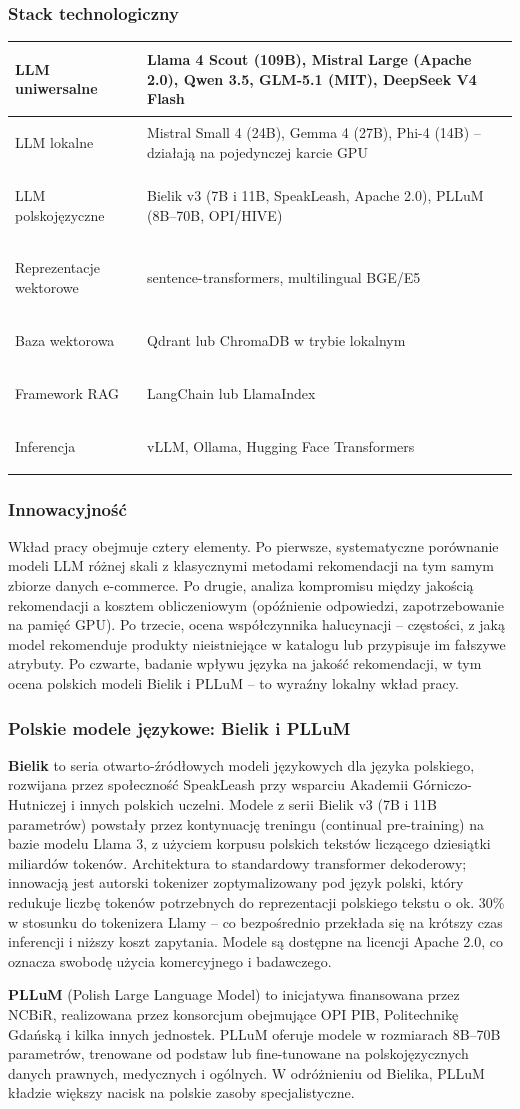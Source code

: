 \documentclass[12pt,a4paper]{article}
\newenvironment{stacktab}{%
    \arrayrulecolor{border}%
    \begin{tabular}{|>{\columncolor{lightbg}\bfseries\color{primary}\raggedright\arraybackslash}p{4.2cm}|>{\raggedright\arraybackslash}p{12cm}|}
    \hline
}{%
    \end{tabular}%
    \arrayrulecolor{black}%
}
\newcommand{\stackrow}[2]{#1 & #2 \\ \hline}
\newcommand{\topicsection}[1]{\subsubsection*{#1}}
\begin{document}
\topicsection{Stack technologiczny}
\begin{stacktab}
\stackrow{LLM uniwersalne}{Llama 4 Scout (109B), Mistral Large (Apache 2.0), Qwen 3.5, GLM-5.1 (MIT), DeepSeek V4 Flash}
\stackrow{LLM lokalne}{Mistral Small 4 (24B), Gemma 4 (27B), Phi-4 (14B) -- działają na pojedynczej karcie GPU}
\stackrow{LLM polskojęzyczne}{Bielik v3 (7B i 11B, SpeakLeash, Apache 2.0), PLLuM (8B--70B, OPI/HIVE)}
\stackrow{Reprezentacje wektorowe}{sentence-transformers, multilingual BGE/E5}
\stackrow{Baza wektorowa}{Qdrant lub ChromaDB w trybie lokalnym}
\stackrow{Framework RAG}{LangChain lub LlamaIndex}
\stackrow{Inferencja}{vLLM, Ollama, Hugging Face Transformers}
\end{stacktab}

\topicsection{Innowacyjność}
Wkład pracy obejmuje cztery elementy. Po pierwsze, systematyczne porównanie modeli LLM różnej skali z klasycznymi metodami rekomendacji na tym samym zbiorze danych e-commerce. Po drugie, analiza kompromisu między jakością rekomendacji a kosztem obliczeniowym (opóźnienie odpowiedzi, zapotrzebowanie na pamięć GPU). Po trzecie, ocena współczynnika halucynacji -- częstości, z jaką model rekomenduje produkty nieistniejące w katalogu lub przypisuje im fałszywe atrybuty. Po czwarte, badanie wpływu języka na jakość rekomendacji, w tym ocena polskich modeli Bielik i PLLuM -- to wyraźny lokalny wkład pracy.

\topicsection{Polskie modele językowe: Bielik i PLLuM}

\textbf{Bielik} to seria otwarto-źródłowych modeli językowych dla języka polskiego, rozwijana przez społeczność SpeakLeash przy wsparciu Akademii Górniczo-Hutniczej i innych polskich uczelni. Modele z serii Bielik v3 (7B i 11B parametrów) powstały przez kontynuację treningu (continual pre-training) na bazie modelu Llama 3, z użyciem korpusu polskich tekstów liczącego dziesiątki miliardów tokenów. Architektura to standardowy transformer dekoderowy; innowacją jest autorski tokenizer zoptymalizowany pod język polski, który redukuje liczbę tokenów potrzebnych do reprezentacji polskiego tekstu o ok. 30\% w stosunku do tokenizera Llamy -- co bezpośrednio przekłada się na krótszy czas inferencji i niższy koszt zapytania. Modele są dostępne na licencji Apache 2.0, co oznacza swobodę użycia komercyjnego i badawczego.

\textbf{PLLuM} (Polish Large Language Model) to inicjatywa finansowana przez NCBiR, realizowana przez konsorcjum obejmujące OPI PIB, Politechnikę Gdańską i kilka innych jednostek. PLLuM oferuje modele w rozmiarach 8B--70B parametrów, trenowane od podstaw lub fine-tunowane na polskojęzycznych danych prawnych, medycznych i ogólnych. W odróżnieniu od Bielika, PLLuM kładzie większy nacisk na polskie zasoby specjalistyczne.
\end{document}
